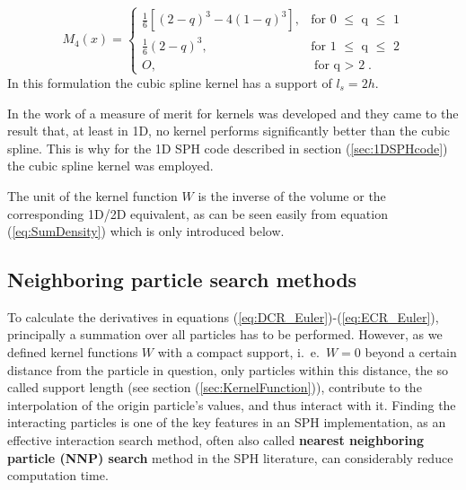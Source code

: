\documentclass{report}
\begin{document}
\begin{equation}
\label{eq:cubicSpline}
M_{4}(x)=\begin{cases}
\frac{1}{6}[(2-q)^{3}-4(1-q)^{3}],& \text{for 0 $\leq$ q $\leq$ 1} \\
\frac{1}{6}(2-q)^{3},&  \text{for 1 $\leq$ q $\leq$ 2} \\
O,& \text{for q $>$ 2}.
\end{cases}
\end{equation}
In this formulation the cubic spline kernel has a support of $l_s=2h$.				


In the work of \cite{Fulk1996} a measure of merit for kernels was developed and
they came to the result that, at least in 1D, no kernel performs significantly better
than the cubic spline.
This is why for the 1D SPH code described in section (\ref{sec:1DSPHcode}) the cubic spline kernel was employed.

The unit of the kernel function $W$ is the inverse of the volume or the corresponding 1D/2D equivalent, as can be seen easily from equation (\ref{eq:SumDensity}) which is only introduced below.


\subsection{Neighboring particle search methods}
\label{sec:NNPS}
To calculate the derivatives in equations (\ref{eq:DCR_Euler})-(\ref{eq:ECR_Euler}), principally a
summation over all particles has to be performed. However, as we defined kernel
functions $W$ with a compact support, i.\ e.\ $W=0$ beyond a certain distance from the particle in question, only particles within this distance, the so called support length (see section (\ref{sec:KernelFunction})), contribute to the
interpolation of the origin particle's values, and thus interact with it. Finding the interacting
particles is one of the key features in an SPH implementation, as an effective
interaction search method, often also called {\bf nearest neighboring particle (NNP)
search} method in the SPH literature, can considerably reduce
computation time. 
\end{document}
